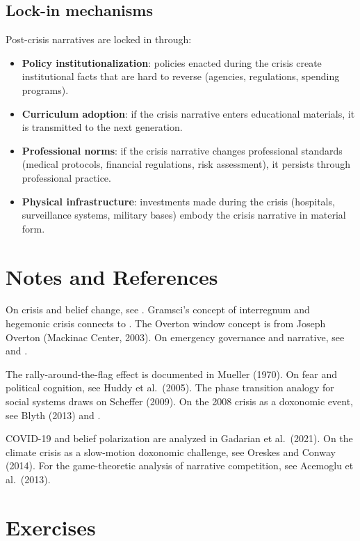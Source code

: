 \subsection{Lock-in mechanisms}

Post-crisis narratives are locked in through:
\begin{itemize}[nosep]
  \item \textbf{Policy institutionalization}: policies enacted during the crisis create institutional facts that are hard to reverse (agencies, regulations, spending programs).
  \item \textbf{Curriculum adoption}: if the crisis narrative enters educational materials, it is transmitted to the next generation.
  \item \textbf{Professional norms}: if the crisis narrative changes professional standards (medical protocols, financial regulations, risk assessment), it persists through professional practice.
  \item \textbf{Physical infrastructure}: investments made during the crisis (hospitals, surveillance systems, military bases) embody the crisis narrative in material form.
\end{itemize}

\section{Notes and References}
\label{sec:ch29-notes}

On crisis and belief change, see \textcite{klein2007}.
Gramsci's concept of interregnum and hegemonic crisis connects to \textcite{gramsci1971}.
The Overton window concept is from Joseph Overton (Mackinac Center, 2003).
On emergency governance and narrative, see \textcite{lippmann1922} and \textcite{herman1988}.

The rally-around-the-flag effect is documented in Mueller (1970).
On fear and political cognition, see Huddy et al.\ (2005).
The phase transition analogy for social systems draws on Scheffer (2009).
On the 2008 crisis as a doxonomic event, see Blyth (2013) and \textcite{mirowski2009}.

COVID-19 and belief polarization are analyzed in Gadarian et al.\ (2021).
On the climate crisis as a slow-motion doxonomic challenge, see Oreskes and Conway (2014).
For the game-theoretic analysis of narrative competition, see Acemoglu et al.\ (2013).

\section{Exercises}

